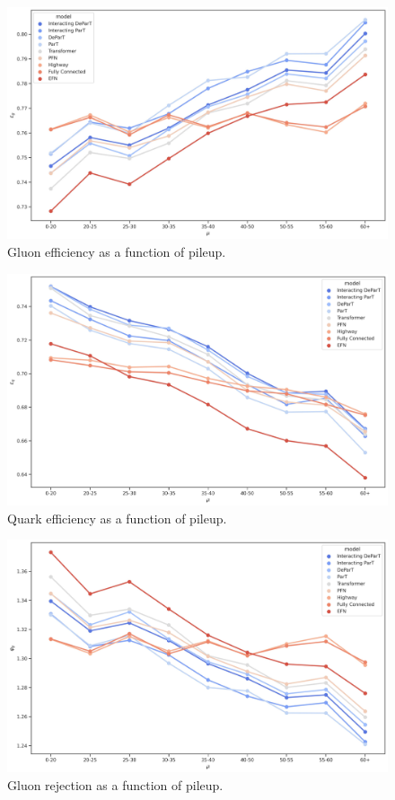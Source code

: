 \begin{figure}[htb]
    \centering
    \includegraphics[width=1\linewidth]{src/plots/results/mu_dep/gluon_efficiency.jpg}
    \caption{Gluon efficiency as a function of pileup.}
    \label{fig:gluon_eff_pileup}
\end{figure}

\begin{figure}[htb]
    \centering
    \includegraphics[width=1\linewidth]{src/plots/results/mu_dep/quark_efficiency.jpg}
    \caption{Quark efficiency as a function of pileup.}
    \label{fig:quark_eff_pileup}
\end{figure}

\begin{figure}[htb]
    \centering
    \includegraphics[width=1\linewidth]{src/plots/results/mu_dep/gluon_rejection.jpg}
    \caption{Gluon rejection as a function of pileup.}
    \label{fig:gluon_rej_pileup}
\end{figure}

